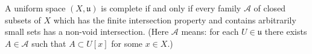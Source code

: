 A uniform space $(X, \mathfrak{u})$ is complete if and only if every family $\mathcal{A}$ of closed subsets of $X$ which has the finite intersection property and contains arbitrarily small sets has a non-void intersection. (Here $\mathcal{A}$  means: for each $U \in \mathfrak{u}$ there exists $A \in \mathcal{A}$ such that $A \subset U[x]$ for some $x \in X$.)
